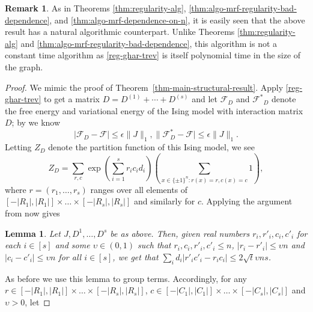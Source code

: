 \documentclass[final, 12pt]{colt2018}
\newtheorem{lemma}[theorem]{Lemma}
\theoremstyle{definition}
\newtheorem{remark}[theorem]{Remark}
\theoremstyle{plain}
\begin{document}
\begin{remark}
As in Theorems \ref{thm:regularity-alg}, \ref{thm:algo-mrf-regularity-bad-dependence}, and \ref{thm:algo-mrf-dependence-on-n}, it is easily seen that the above result has a natural algorithmic counterpart. Unlike Theorems \ref{thm:regularity-alg} and \ref{thm:algo-mrf-regularity-bad-dependence}, this algorithm is not a constant time algorithm as \cref{reg-ghar-trev} is itself polynomial time in the size of the graph.  
\end{remark}

\begin{proof}
We mimic the proof of Theorem~\ref{thm-main-structural-result}. Apply \cref{reg-ghar-trev} to get a matrix $D = D^{(1)} + \cdots + D^{(s)}$ and let $\mathcal{F}_D$ and $\mathcal{F^*}_D$ denote the free energy and variational energy
of the Ising model with interaction matrix $D$; by  we
know
\[ |\mathcal{F}_D - \mathcal{F}| \le \epsilon \|J\|_1, \|\mathcal{F}^*_D - \mathcal{F}| \le \epsilon\|J\|_1. \]
Letting $Z_D$ denote the partition function of this Ising model, we see
\[
Z_{D}=\sum_{r,c}\exp\left(\sum_{i=1}^{s}r_{i}c_{i}d_{i}\right)\left(\sum_{x\in\{\pm1\}^{n}:r(x)=r,c(x)=c}1\right),
\]
where $r=(r_{1},\dots,r_{s})$ ranges over all elements of $[-|R_{1}|,|R_{1}|]\times\dots\times[-|R_{s}|,|R_{s}|]$
and similarly for $c$.
Applying the argument from  now gives
\begin{lemma}\label{lemma:gamma-def2}
Let $J, D^{1},\dots,D^{s}$ be as above. Then, given real numbers $r_{i},r'_{i},c_{i},c'_{i}$ for each $i\in[s]$ and some 
$\upsilon \in (0,1)$ such that $r_i,c_i,r'_i,c'_i \le n$, 
$|r_i - r'_i| \le \upsilon n$ and $|c_i - c'_i| \le \upsilon n$ 
for all $i\in[s]$, we get that 
$\sum_i d_i|r'_i c'_i - r_i c_i| \le 2\sqrt{t}\upsilon ns$. 
\end{lemma}
\iffalse %
\begin{proof}
From \cref{reg-ghar-trev}, we know that for all $i\in[s]$,  
$|d_i| \le \frac{\sqrt{t}}{n}$.
Since $ |r'_i c'_i - r_i c_i| \le |c'_i||r'_i - r_i| + |r_i||c'_i - c_i| \le 2\upsilon n^2$, it follows that
\begin{align*}
\sum_i d_i|r'_i c'_i - r_i c_i|
\le \sum_i d_i 2\upsilon n^2
\le 2\sqrt{t}\upsilon ns.
\end{align*} 
\end{proof}
\fi
As before we use this lemma to group terms.
Accordingly, for any $r \in [-|R_1|,|R_1|]\times\dots\times[-|R_s|,|R_s|]$, $c \in [-|C_1|,|C_1|]\times\dots\times[-|C_s|,|C_s|]$ and $\upsilon > 0$, let 

\end{proof}
\end{document}
